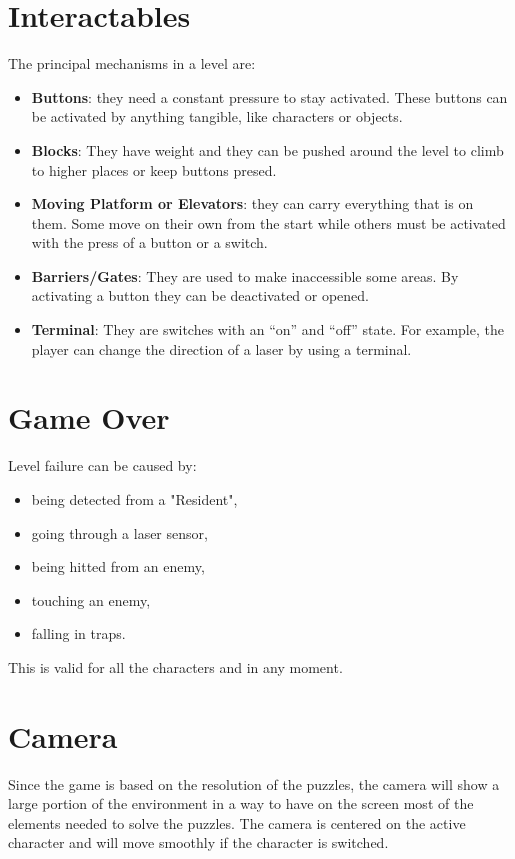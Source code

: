 \documentclass[12pt, a4paper]{report}
\begin{document}
\section*{Interactables}
The principal mechanisms in a level are:
\begin{itemize}
	\item \textbf{Buttons}: they need a constant pressure to stay activated. These buttons can be activated by anything tangible, like characters or objects.
	\item \textbf{Blocks}: They have weight and they can be pushed around the level to climb to higher places or keep buttons presed.
	\item \textbf{Moving Platform or Elevators}: they can carry everything that is on them. Some move on their own from the start while others must be activated with the press of a button or a switch.
	\item \textbf{Barriers/Gates}: They are used to make inaccessible some areas. By activating a button they can be deactivated or opened.
	\item \textbf{Terminal}: They are switches with an “on” and “off” state. For example, the player can change the direction of a laser by using a terminal.
\end{itemize}

\section*{Game Over}
Level failure can be caused by:
\begin{itemize}
	\item being detected from a "Resident",
	\item going through a laser sensor,
	\item being hitted from an enemy,
	\item touching an enemy,
	\item falling in traps.
\end{itemize}
This is valid for all the characters and in any moment.


\section*{Camera}
Since the game is based on the resolution of the puzzles, the camera will show a large portion of the environment in a way to have on the screen most of the elements needed to solve the puzzles. The camera is centered on the active character and will move smoothly if the character is switched.
\end{document}

